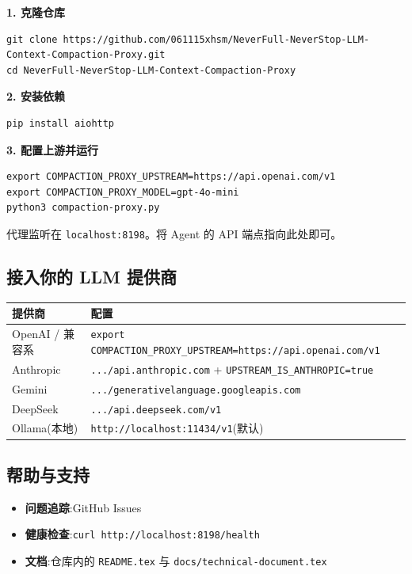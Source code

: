 \documentclass[11pt,a4paper]{article}
\begin{document}
\textbf{1. 克隆仓库}

\begin{lstlisting}
git clone https://github.com/061115xhsm/NeverFull-NeverStop-LLM-Context-Compaction-Proxy.git
cd NeverFull-NeverStop-LLM-Context-Compaction-Proxy
\end{lstlisting}

\textbf{2. 安装依赖}

\begin{lstlisting}
pip install aiohttp
\end{lstlisting}

\textbf{3. 配置上游并运行}

\begin{lstlisting}
export COMPACTION_PROXY_UPSTREAM=https://api.openai.com/v1
export COMPACTION_PROXY_MODEL=gpt-4o-mini
python3 compaction-proxy.py
\end{lstlisting}

代理监听在 \texttt{localhost:8198}。将 Agent 的 API 端点指向此处即可。

\subsection{接入你的 LLM 提供商}

\begin{longtable}{@{}lp{9cm}@{}}
  \toprule
  提供商 & 配置 \\
  \midrule
  OpenAI / 兼容系 & \texttt{export COMPACTION\_PROXY\_UPSTREAM=https://api.openai.com/v1} \\
  Anthropic & \texttt{.../api.anthropic.com} + \texttt{UPSTREAM\_IS\_ANTHROPIC=true} \\
  Gemini & \texttt{.../generativelanguage.googleapis.com} \\
  DeepSeek & \texttt{.../api.deepseek.com/v1} \\
  Ollama(本地) & \texttt{http://localhost:11434/v1}(默认) \\
  \bottomrule
\end{longtable}

\subsection{帮助与支持}

\begin{itemize}
  \item \textbf{问题追踪}:GitHub Issues
  \item \textbf{健康检查}:\texttt{curl http://localhost:8198/health}
  \item \textbf{文档}:仓库内的 \texttt{README.tex} 与 \texttt{docs/technical-document.tex}
\end{itemize}
\end{document}
